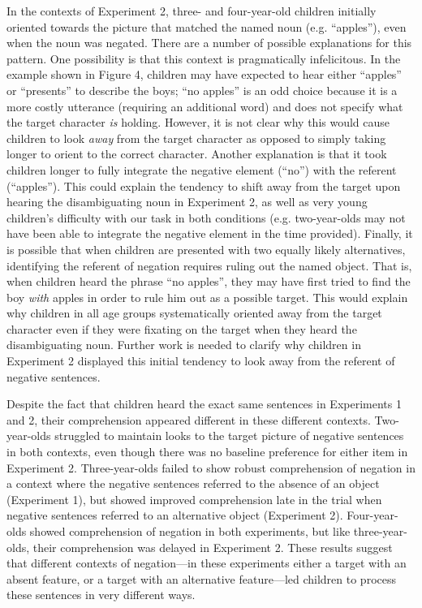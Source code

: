 \documentclass[man]{apa2}
\begin{document}
In the contexts of Experiment 2, three- and four-year-old children initially oriented towards the picture that matched the named noun (e.g. ``apples''), even when the noun was negated.  There are a number of possible explanations for this pattern.  One possibility is that this context is pragmatically infelicitous.  In the example shown in Figure 4, children may have expected to hear either ``apples'' or ``presents'' to describe the boys; ``no apples'' is an odd choice because it is a more costly utterance (requiring an additional word) and does not specify what the target character \emph{is} holding.  However, it is not clear why this would cause children to look \emph{away} from the target character as opposed to simply taking longer to orient to the correct character.  Another explanation is that it took children longer to fully integrate the negative element (``no'') with the referent (``apples'').  This could explain the tendency to shift away from the target upon hearing the disambiguating noun in Experiment 2, as well as very young children's difficulty with our task in both conditions (e.g. two-year-olds may not have been able to integrate the negative element in the time provided).  Finally, it is possible that when children are presented with two equally likely alternatives, identifying the referent of negation requires ruling out the named object.  That is, when children heard the phrase ``no apples'', they may have first tried to find the boy \emph{with} apples in order to rule him out as a possible target.  This would explain why children in all age groups systematically oriented away from the target character even if they were fixating on the target when they heard the disambiguating noun.  Further work is needed to clarify why children in Experiment 2 displayed this initial tendency to look away from the referent of negative sentences.  

Despite the fact that children heard the exact same sentences in Experiments 1 and 2, their comprehension appeared different in these different contexts.  Two-year-olds struggled to maintain looks to the target picture of negative sentences in both contexts, even though there was no baseline preference for either item in Experiment 2.  Three-year-olds failed to show robust comprehension of negation in a context where the negative sentences referred to the absence of an object (Experiment 1), but showed improved comprehension late in the trial when negative sentences referred to an alternative object (Experiment 2).  Four-year-olds showed comprehension of negation in both experiments, but like three-year-olds, their comprehension was delayed in Experiment 2.  These results suggest that different contexts of negation---in these experiments either a target with an absent feature, or a target with an alternative feature---led children to process these sentences in very different ways.  
\end{document}
